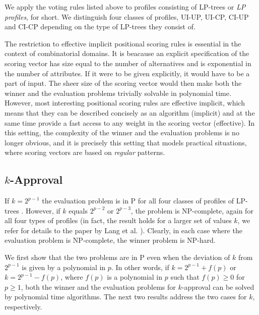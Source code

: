 We apply the voting rules listed above to profiles consisting of LP-trees or
\emph{LP profiles}, for short. We distinguish four classes of profiles,
UI-UP, UI-CP, CI-UP and CI-CP depending on the type of LP-trees they
consist of. 

\begin{remark}
The restriction to effective implicit positional scoring rules is 
essential in the context of combinatorial domains. It is beacause an 
explicit specification of the scoring vector has size equal to the 
number of alternatives and is exponential in the number of attributes. If 
it were to be given explicitly, it would have to be a part of input. 
The sheer size of the scoring vector would then make both the winner 
and the evaluation problems trivially solvable in polynomial time. 
However, most interesting positional scoring rules are effective 
implicit, which means that they can be described concisely as an 
algorithm (implicit) and at the same time provide a fast access to 
any weight in the scoring vector (effective). In this setting, the 
complexity of the winner and the evaluation problems is no longer 
obvious, and it is precisely this setting that models practical
situations, where scoring vectors are based on \emph{regular}
patterns.
\end{remark}


\subsection{$k$-Approval}
If $k=2^{p-1}$ the evaluation problem is in P for all four classes of 
profiles of LP-trees \cite{lang:aggLP}. However, if $k$ equals $2^{p-2}$
or $2^{p-3}$, the problem is NP-complete, again for all four types of 
profiles \cite{lang:aggLP} (in fact, the result holds for a larger set 
of values $k$, we refer for details to the paper by Lang et al. 
\cite{lang:aggLP}). Clearly, in each case where the evaluation problem 
is NP-complete, the winner problem is NP-hard.

We first show that the two problems are in P even when the deviation of
$k$ from $2^{p-1}$ is given by a polynomial in $p$. In other words, 
if $k=2^{p-1} + f(p)$ or $k=2^{p-1} - f(p)$, where $f(p)$ is a polynomial 
in $p$ such that $f(p)\geq 0$ for $p\geq 1$, both the winner and the 
evaluation problems for $k$-approval can be solved by polynomial time 
algorithms. The next two results address the two cases for $k$,
respectively.

